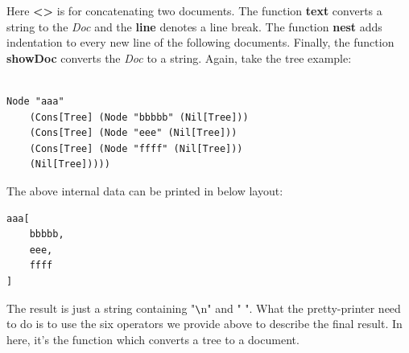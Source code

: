 Here \textbf{<>} is for concatenating two documents. The function \textbf{text} converts a string to the \textit{Doc} and the \textbf{line} denotes a line break. The function \textbf{nest} adds indentation to every new line of the following documents. Finally, the function \textbf{showDoc} converts the \textit{Doc} to a string. Again, take the tree example:

\begin{lstlisting}

Node "aaa"
    (Cons[Tree] (Node "bbbbb" (Nil[Tree]))
    (Cons[Tree] (Node "eee" (Nil[Tree]))
    (Cons[Tree] (Node "ffff" (Nil[Tree]))
    (Nil[Tree]))))

\end{lstlisting}

The above internal data can be printed in below layout:

\begin{lstlisting}
aaa[
    bbbbb,
    eee,
    ffff
]
\end{lstlisting}

The result is just a string containing "\verb|\|n" and " ". What the pretty-printer need to do is to use the six operators we provide above to describe the final result. In here, it's the function which converts a tree to a document.

